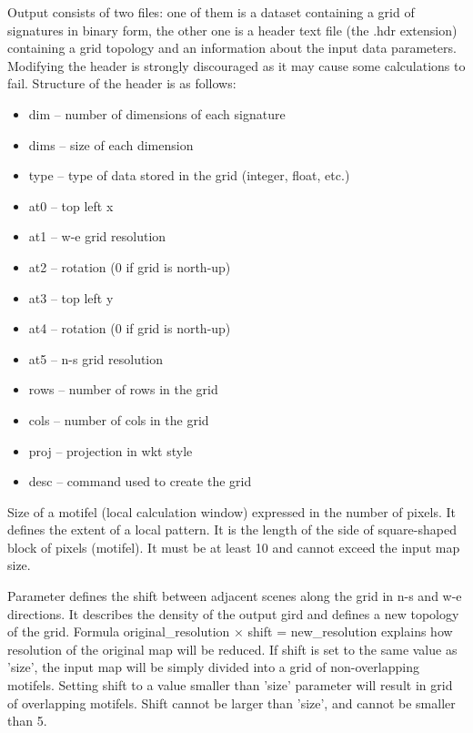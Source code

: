 
Output consists of two files: one of them is a dataset containing a grid of signatures in binary form, the other one is a header text file (the .hdr extension) containing a grid topology and an information about the input data parameters.
Modifying the header is strongly discouraged as it may cause some calculations to fail. 
Structure of the header is as follows:\\

\begin{itemize}
	\item dim -- number of dimensions of each signature
	\item dims -- size of each dimension
	\item type -- type of data stored in the grid (integer, float, etc.)
	\item at0 -- top left x
	\item at1 -- w-e grid resolution
	\item at2 -- rotation (0 if grid is north-up)
	\item at3 -- top left y
	\item at4 -- rotation (0 if grid is north-up)
	\item at5 -- n-s grid resolution
	\item rows -- number of rows in the grid
	\item cols -- number of cols in the grid
	\item proj -- projection in wkt style
	\item desc -- command used to create the grid
\end{itemize}


Size of a motifel (local calculation window) expressed in the number of pixels. 
It defines the extent of a local pattern.
It is the length of the side of square-shaped block of pixels (motifel).
It must be at least 10 and cannot exceed the input map size.


Parameter defines the shift between adjacent scenes along the grid in n-s and w-e directions. 
It describes the density of the output gird and defines a new topology of the grid.
Formula original\_resolution $\times$ shift = new\_resolution explains how resolution of the original map will be reduced. 
If shift is set to the same value as 'size', the input map will be simply divided into a grid of non-overlapping motifels. 
Setting shift to a value smaller than 'size' parameter will result in grid of overlapping motifels. 
Shift cannot be larger than 'size', and cannot be smaller than 5.

